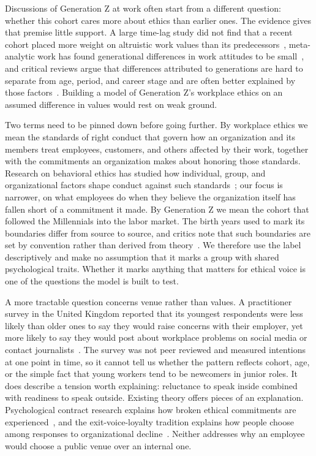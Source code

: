 \documentclass[12pt,a4paper]{article}
\theoremstyle{definition}
\begin{document}
Discussions of Generation Z at work often start from a different question: whether this cohort cares more about ethics than earlier ones. The evidence gives that premise little support. A large time-lag study did not find that a recent cohort placed more weight on altruistic work values than its predecessors~\citep{twenge2010generational}, meta-analytic work has found generational differences in work attitudes to be small~\citep{costanza2012generational}, and critical reviews argue that differences attributed to generations are hard to separate from age, period, and career stage and are often better explained by those factors~\citep{lyons2014generational,rudolph2021generations}. Building a model of Generation Z's workplace ethics on an assumed difference in values would rest on weak ground.

Two terms need to be pinned down before going further. By workplace ethics we mean the standards of right conduct that govern how an organization and its members treat employees, customers, and others affected by their work, together with the commitments an organization makes about honoring those standards. Research on behavioral ethics has studied how individual, group, and organizational factors shape conduct against such standards~\citep{trevino2006behavioral}; our focus is narrower, on what employees do when they believe the organization itself has fallen short of a commitment it made. By Generation Z we mean the cohort that followed the Millennials into the labor market. The birth years used to mark its boundaries differ from source to source, and critics note that such boundaries are set by convention rather than derived from theory~\citep{rudolph2021generations}. We therefore use the label descriptively and make no assumption that it marks a group with shared psychological traits. Whether it marks anything that matters for ethical voice is one of the questions the model is built to test.

A more tractable question concerns venue rather than values. A practitioner survey in the United Kingdom reported that its youngest respondents were less likely than older ones to say they would raise concerns with their employer, yet more likely to say they would post about workplace problems on social media or contact journalists~\citep{protect2025talkin}. The survey was not peer reviewed and measured intentions at one point in time, so it cannot tell us whether the pattern reflects cohort, age, or the simple fact that young workers tend to be newcomers in junior roles. It does describe a tension worth explaining: reluctance to speak inside combined with readiness to speak outside. Existing theory offers pieces of an explanation. Psychological contract research explains how broken ethical commitments are experienced~\citep{thompson2003violations}, and the exit-voice-loyalty tradition explains how people choose among responses to organizational decline~\citep{hirschman1970exit,turnley1999impact}. Neither addresses why an employee would choose a public venue over an internal one.
\end{document}
